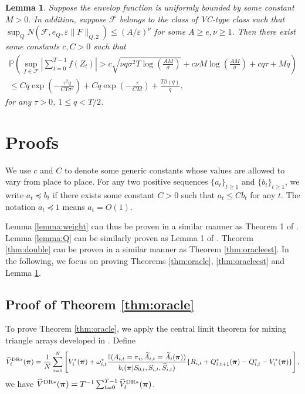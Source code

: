 \documentclass{article}
\newtheorem{lemma}{Lemma}[section]
\newcommand{\prob}{{\mathbb{P}}}
\begin{document}
\begin{lemma}\label{lemma:EP}
	Suppose the envelop function is uniformly bounded by some constant $M>0$. In addition, suppose $\mathcal{F}$ belongs to the class of VC-type class such that $\sup_Q N(\mathcal{F}, e_Q, \varepsilon \|F\|_{Q,2})\le (A/\varepsilon)^{\nu}$ \citep[see Definition 2.1 in][for details]{cherno2014} for some $A\ge e,\nu\ge 1$. Then there exist some constants $c,C>0$ such that
	\begin{eqnarray*}
		\prob\left(\sup_{f\in \mathcal{F}}\left|\sum_{t=0}^{T-1} f(Z_t)\right|>c\sqrt{\nu q\sigma^2T \log \left(\frac{AM}{\sigma}\right)}+c\nu M \log \left(\frac{AM}{\sigma}\right)+c q\tau+Mq\right)\\
		\le Cq\exp\left(-\frac{\tau^2q}{CT\sigma^2}\right)+Cq\exp\left(-\frac{\tau}{CM}\right)+\frac{T\beta(q)}{q},
	\end{eqnarray*}
	for any $\tau>0$, $1\le q<T/2$. 
\end{lemma}

\section{Proofs}
We use $c$ and $C$ to denote some generic constants whose values are allowed to vary from place to place. For any two positive sequences $\{a_t\}_{t\ge 1}$ and $\{b_t\}_{t\ge 1}$, we write $a_t\preceq b_t$ if there exists some constant $C>0$ such that $a_t\le Cb_t$ for any $t$. The notation $a_t\preceq 1$ means $a_t=O(1)$.

Lemma \ref{lemma:weight} can thus be proven in a similar manner as Theorem 1 of \cite{liu2018}.  Lemma \ref{lemma:Q} can be similarly proven as Lemma 1 of \cite{shi2020reinforcement}. Theorem \ref{thm:double} can be proven in a similar manner as Theorem \ref{thm:oracleest}. 
In the following, we focus on proving Theorems \ref{thm:oracle}, \ref{thm:oracleest} and Lemma \ref{lemma:EP}. 
\subsection{Proof of Theorem \ref{thm:oracle}}
To prove Theorem \ref{thm:oracle}, we apply the central limit theorem for mixing triangle arrays developed in \cite{francq2005central}. Define
\begin{eqnarray*}
	\widehat{V}_t^{\hbox{\scriptsize{DR}}*}(\bm{\pi})=\frac{1}{N}\sum_{i=1}^N \left[V_i^*(\bm{\pi})+ \omega_{i,t}^*\frac{\mathbb{I}(A_{i,t}=\pi_i,\widetilde{A}_{i,t}=\widetilde{A}_i(\bm{\pi}))}{b_i(\bm{\pi}|S_{0,t},S_{i,t},\widetilde{S}_{i,t})}
	\{R_{i,t}+Q_{i,t+1}^*(\bm{\pi})-Q_{i,t}^*-V_i^*(\bm{\pi})\}\right],
\end{eqnarray*}
we have $\widehat{V}^{\hbox{\scriptsize{DR}}*}(\bm{\pi})=T^{-1} \sum_{t=0}^{T-1} \widehat{V}_t^{\hbox{\scriptsize{DR}}*}(\bm{\pi})$. 
\end{document}
